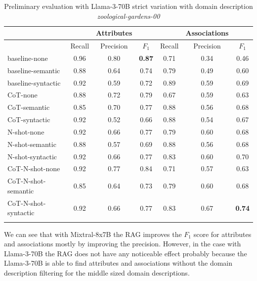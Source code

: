 \begin{table}[!h]
    \scriptsize
    \centering
    \setlength{\tabcolsep}{0.5em}
    \begin{tabular}{lcccccc}
    \toprule
         & & Attributes & & & Associations & \\
     \toprule
         & Recall & Precision & $F_1$ & Recall & Precision & $F_1$ \\
    \toprule
    
    \addlinespace
         baseline-none        & 0.96 & 0.80 & \textbf{0.87} & 0.71 & 0.34 & 0.46 \\
    	 baseline-semantic    & 0.88 & 0.64 & 0.74 & 0.79 & 0.49 & 0.60 \\
         baseline-syntactic   & 0.92 & 0.59 & 0.72 & 0.89 & 0.59 & 0.69 \\
         CoT-none             & 0.88 & 0.72 & 0.79 & 0.67 & 0.59 & 0.63 \\
         CoT-semantic         & 0.85 & 0.70 & 0.77 & 0.88 & 0.56 & 0.68 \\
         CoT-syntactic        & 0.92 & 0.52 & 0.66 & 0.88 & 0.54 & 0.67 \\
         N-shot-none          & 0.92 & 0.66 & 0.77 & 0.79 & 0.60 & 0.68 \\
         N-shot-semantic      & 0.88 & 0.57 & 0.69 & 0.88 & 0.56 & 0.68 \\
         N-shot-syntactic     & 0.92 & 0.66 & 0.77 & 0.83 & 0.60 & 0.70 \\
         CoT-N-shot-none      & 0.92 & 0.77 & 0.84 & 0.71 & 0.57 & 0.63 \\
         CoT-N-shot-semantic  & 0.85 & 0.64 & 0.73 & 0.79 & 0.60 & 0.68 \\
         CoT-N-shot-syntactic & 0.92 & 0.66 & 0.77 & 0.83 & 0.67 & \textbf{0.74} \\
    \addlinespace
    \bottomrule
    \addlinespace
    \end{tabular}
    \caption{Preliminary evaluation with Llama-3-70B strict variation with domain description \textit{zoological-gardens-00}}
    \label{tab:preliminary-llama}
\end{table}

We can see that with Mixtral-8x7B the RAG improves the $F_1$ score for attributes and associations mostly by improving the precision. However, in the case with Llama-3-70B the RAG does not have any noticeable effect probably because the Llama-3-70B is able to find attributes and associations without the domain description filtering for the middle sized domain descriptions.

